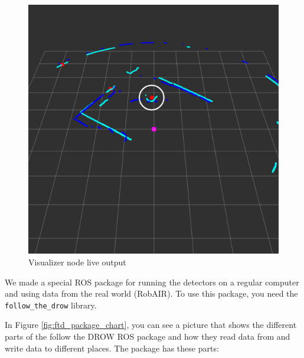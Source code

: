 \documentclass{article}
\begin{document}
\begin{figure}[b!]
	\centering
	\includegraphics[width=0.75\linewidth]{ftd_live_output}
	\caption{Visualizer node live output}
	\label{fig:visualizer_node_live}
\end{figure}

We made a special ROS package for running the detectors on a regular computer and using data from the real world (RobAIR).
To use this package, you need the \texttt{follow\_the\_drow} library.

In Figure \ref{fig:ftd_package_chart}, you can see a picture that shows the different parts of the follow the DROW ROS package and how they read data from and write data to different places.
The package has these parts:
\end{document}
